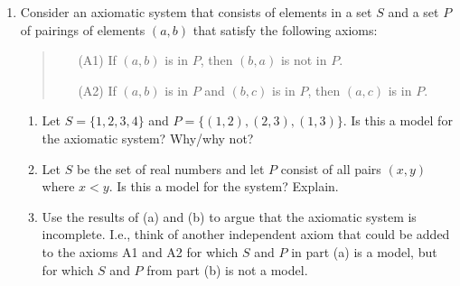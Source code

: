 \begin{exercises}{}{}
\begin{enumerate}


	\item Consider an axiomatic system that consists of elements in a set $S$ and a set $P$ of pairings of elements $(a,b)$ that satisfy the following axioms:
  \begin{quote}
  \begin{itemize}%
  	\item[(A1)] If $(a,b)$ is in $P$, then $(b,a)$ is not in $P$.
  	\item[(A2)] If $(a,b)$ is in $P$ and $(b,c)$ is in $P$, then $(a,c)$ is in $P$.
  \end{itemize}
  \end{quote}
  \begin{enumerate}%
    \item Let $S=\{1,2,3,4\}$ and $P=\{(1,2),(2,3),(1,3)\}$. Is this a model for the axiomatic system? Why/why not?
		\item Let $S$ be the set of real numbers and let $P$ consist of all pairs $(x,y)$ where $x<y$. Is this a model for the system? Explain.
		\item Use the results of (a) and (b) to argue that the axiomatic system is incomplete. I.e., think of another independent axiom that could be added to the axioms A1 and A2 for which $S$ and $P$ in part (a) is a model, but for which $S$ and $P$ from part (b) is not a model.
	\end{enumerate}
	

\end{enumerate}
\end{exercises}
